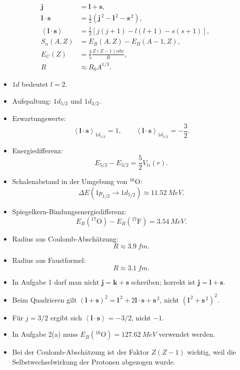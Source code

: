 \documentclass[11pt,a4paper]{scrartcl}
\newcommand{\avg}[1]{\left\langle #1 \right\rangle}
\newcommand{\paren}[1]{\left( #1 \right)}
\newcommand{\bracket}[1]{\left[ #1 \right]}
\newcommand{\vect}[1]{\bm{#1}}
\newcommand{\half}{\frac{1}{2}}
\newcommand{\isotope}[2]{^{#1}\mathrm{#2}}
\theoremstyle{definition}
\theoremstyle{plain}
\theoremstyle{remark}
\begin{document}
\begin{summarybox}[title={Formeln, die man k\"onnen sollte}]
\begin{align*}
    \vect{j}&=\vect{l}+\vect{s},\\
    \vect{l}\cdot\vect{s}&=\half\paren{\vect{j}^{\,2}-\vect{l}^{\,2}-\vect{s}^{\,2}},\\
    \avg{\vect{l}\cdot\vect{s}}&=\half\bracket{j(j+1)-l(l+1)-s(s+1)},\\
    S_n(A,Z)&=E_B(A,Z)-E_B(A-1,Z),\\
    E_C(Z)&=\frac{3}{5}\frac{Z(Z-1)\alpha\hbar c}{R},\\
    R&\approx R_0A^{1/3}.
\end{align*}
\end{summarybox}

\begin{summarybox}[title=Endergebnisse]
\begin{itemize}
    \item $1d$ bedeutet $l=2$.
    \item Aufspaltung: $1d_{5/2}$ und $1d_{3/2}$.
    \item Erwartungswerte:
    \[
        \avg{\vect{l}\cdot\vect{s}}_{1d_{5/2}}=1,
        \qquad
        \avg{\vect{l}\cdot\vect{s}}_{1d_{3/2}}=-\frac{3}{2}.
    \]
    \item Energiedifferenz:
    \[
        E_{5/2}-E_{3/2}=\frac{5}{2}V_{ls}(r).
    \]
    \item Schalenabstand in der Umgebung von $\isotope{16}{O}$:
    \[
        \Delta E(1p_{1/2}\to 1d_{5/2})\approx\SI{11.52}{MeV}.
    \]
    \item Spiegelkern-Bindungsenergiedifferenz:
    \[
        E_B(\isotope{17}{O})-E_B(\isotope{17}{F})=\SI{3.54}{MeV}.
    \]
    \item Radius aus Coulomb-Absch\"atzung:
    \[
        R\approx\SI{3.9}{fm}.
    \]
    \item Radius aus Faustformel:
    \[
        R\approx\SI{3.1}{fm}.
    \]
\end{itemize}
\end{summarybox}

\begin{warningbox}[title=Typische Fehler]
\begin{itemize}
    \item In Aufgabe 1 darf man nicht $\vect{j}=\vect{k}+\vect{s}$ schreiben; korrekt ist $\vect{j}=\vect{l}+\vect{s}$.
    \item Beim Quadrieren gilt $(\vect{l}+\vect{s})^2=\vect{l}^{\,2}+2\vect{l}\cdot\vect{s}+\vect{s}^{\,2}$, nicht $(\vect{l}^{\,2}+\vect{s}^{\,2})^2$.
    \item F\"ur $j=3/2$ ergibt sich $\avg{\vect{l}\cdot\vect{s}}=-3/2$, nicht $-1$.
    \item In Aufgabe 2(a) muss $E_B(\isotope{16}{O})=\SI{127.62}{MeV}$ verwendet werden.
    \item Bei der Coulomb-Absch\"atzung ist der Faktor $Z(Z-1)$ wichtig, weil die Selbstwechselwirkung der Protonen abgezogen wurde.
\end{itemize}
\end{warningbox}
\end{document}

